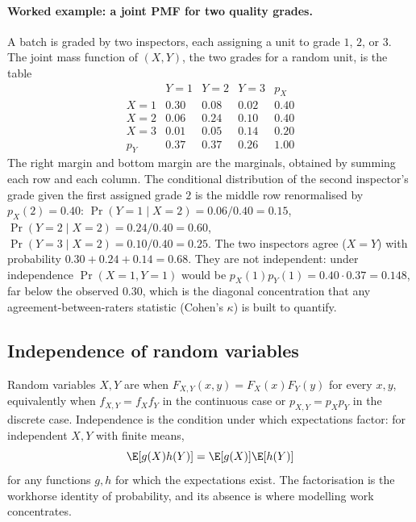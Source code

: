 \paragraph{Worked example: a joint PMF for two quality grades.}
A batch is graded by two inspectors, each assigning a unit to grade
$1$, $2$, or $3$. The joint mass function of $(X, Y)$, the two
grades for a random unit, is the table
\[
\begin{array}{c|ccc|c}
 & Y=1 & Y=2 & Y=3 & p_X \\ \hline
X=1 & 0.30 & 0.08 & 0.02 & 0.40 \\
X=2 & 0.06 & 0.24 & 0.10 & 0.40 \\
X=3 & 0.01 & 0.05 & 0.14 & 0.20 \\ \hline
p_Y & 0.37 & 0.37 & 0.26 & 1.00
\end{array}
\]
The right margin and bottom margin are the marginals, obtained by
summing each row and each column. The conditional distribution of
the second inspector's grade given the first assigned grade $2$ is
the middle row renormalised by $p_{X}(2) = 0.40$:
$\Pr(Y = 1 \mid X = 2) = 0.06/0.40 = 0.15$,
$\Pr(Y = 2 \mid X = 2) = 0.24/0.40 = 0.60$,
$\Pr(Y = 3 \mid X = 2) = 0.10/0.40 = 0.25$. The two inspectors
agree ($X = Y$) with probability $0.30 + 0.24 + 0.14 = 0.68$. They
are not independent: under independence $\Pr(X = 1, Y = 1)$ would be
$p_{X}(1) p_{Y}(1) = 0.40 \cdot 0.37 = 0.148$, far below the
observed $0.30$, which is the diagonal concentration that any
agreement-between-raters statistic (Cohen's $\kappa$) is built to
quantify.

\subsection{Independence of random variables}

Random variables $X, Y$ are  when
$F_{X, Y}(x, y) = F_{X}(x) F_{Y}(y)$ for every $x, y$, equivalently
when $f_{X, Y} = f_{X} f_{Y}$ in the continuous case or
$p_{X, Y} = p_{X} p_{Y}$ in the discrete case. Independence is the
condition under which expectations factor: for independent $X, Y$
with finite means,
\[
\E[g(X) h(Y)] = \E[g(X)] \E[h(Y)]
\]
for any functions $g, h$ for which the expectations exist. The
factorisation is the workhorse identity of probability, and its
absence is where modelling work concentrates.

